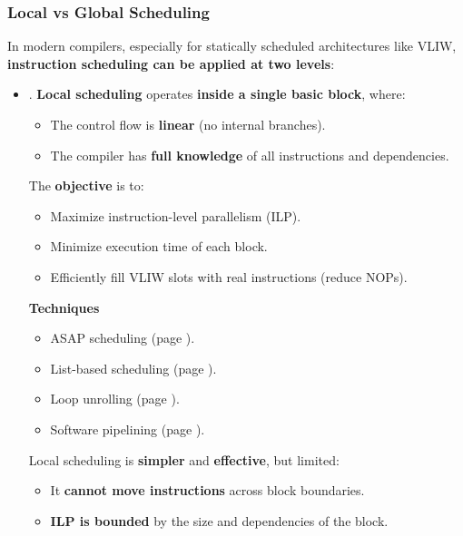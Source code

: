 \subsubsection{Local vs Global Scheduling}

In modern compilers, especially for statically scheduled architectures like VLIW, \textbf{instruction scheduling can be applied at two levels}:
\begin{itemize}
    \item {}. \textbf{Local scheduling} operates \textbf{inside a single basic block}, where:
    \begin{itemize}
        \item The control flow is \textbf{linear} (no internal branches).
        \item The compiler has \textbf{full knowledge} of all instructions and dependencies.
    \end{itemize}
    \textcolor{Green3}{} The \textcolor{Green3}{\textbf{objective}} is to:
    \begin{itemize}
        \item Maximize instruction-level parallelism (ILP).
        \item Minimize execution time of each block.
        \item Efficiently fill VLIW slots with real instructions (reduce NOPs).
    \end{itemize}
    \textcolor{Green3}{ \textbf{Techniques}}
    \begin{itemize}
        \item ASAP scheduling (page \pageref{subsubsection: ASAP Scheduling Algorithm}).
        \item List-based scheduling (page \pageref{subsubsection: List-Based Scheduling Algorithm}).
        \item Loop unrolling (page \pageref{paragraph: Loop Unrolling}).
        \item Software pipelining (page \pageref{paragraph: Software Pipelining}).
    \end{itemize}
    Local scheduling is \textbf{simpler} and \textbf{effective}, but limited:
    \begin{itemize}[label=\textcolor{Red2}{}]
        \item It \textbf{cannot move instructions} across block boundaries.
        \item \textbf{ILP is bounded} by the size and dependencies of the block.
    \end{itemize}



\end{itemize}
